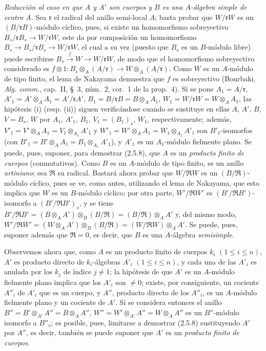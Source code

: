 \begin{env}[2.5.8.8]
\label{IV.2.5.8.8-fr}
\emph{Reducción al caso en que $A$ y $A'$ son cuerpos y $B$ es una $A$-álgebra
simple de centro $A$.} Sea $\mathfrak r$ el radical del anillo semi-local $A$;
basta probar que $W/\mathfrak rW$ es un $(B/\mathfrak rB)$-módulo cíclico,
pues, si existe un homomorfismo sobreyectivo
$B_s/\mathfrak rB_s\to W/\mathfrak rW$, este da por composición un
homomorfismo $B_s\to B_s/\mathfrak rB_s\to W/\mathfrak rW$, el cual a su vez
(puesto que $B_s$ es un $B$-módulo libre) puede escribirse
$B_s\xrightarrow{f}W\to W/\mathfrak rW$, de modo que el homomorfismo
sobreyectivo considerado es
$f\otimes1:B_s\otimes_A(A/\mathfrak r)\longrightarrow W\otimes_A(A/\mathfrak r)$.
Como $W$ es un $A$-módulo de tipo finito, el lema de Nakayama demuestra que
$f$ es sobreyectivo (Bourbaki, \emph{Alg. comm.}, cap.~II, \S~3,
núm.~2, cor.~1 de la prop.~4). Si se pone $A_1=A/\mathfrak r$, $A'_1=A'\otimes_A A_1=A'/\mathfrak rA'$,
$B_1=B/\mathfrak rB=B\otimes_A A_1$, $W_1=W/\mathfrak rW=W\otimes_A A_1$,
las hipótesis (i) (resp. (ii)) siguen verificándose cuando se sustituye en ellas
$A$, $A'$, $B$, $V=B_s$, $W$ por $A_1$, $A'_1$, $B_1$,
$V_1=(B_1)_s$, $W_1$, respectivamente; además,
$V'_1=V'\otimes_A A_1=V_1\otimes_{A_1}A'_1$ y
$W'_1=W'\otimes_A A_1=W_1\otimes_{A_1}A'_1$ son $B'_1$-isomorfos (con
$B'_1=B'\otimes_A A_1=B_1\otimes_{A_1}A'_1$), y $A'_1$ es un $A_1$-módulo
fielmente plano. Se puede, pues, suponer, para demostrar (2.5.8), que $A$ es un
\emph{producto finito de cuerpos} (conmutativos). Como $B$ es un $A$-módulo de
tipo finito, es un anillo \emph{artiniano}; sea $\mathfrak R$ su radical. Bastará ahora
probar que $W/\mathfrak RW$ es un $(B/\mathfrak R)$-módulo cíclico, pues se ve,
como antes, utilizando el lema de Nakayama, que esto implica que $W$ es un
$B$-módulo cíclico; por otra parte, $W'/\mathfrak RW'$ es
$(B'/\mathfrak RB')$-isomorfo a $(B'/\mathfrak RB')_s$, y se tiene
$B'/\mathfrak RB'=(B\otimes_A A')\otimes_B(B/\mathfrak R)=(B/\mathfrak R)\otimes_A A'$
y, del mismo modo,
$W'/\mathfrak RW'=(W\otimes_A A')\otimes_B(B/\mathfrak R)=(W/\mathfrak RW)\otimes_A A'$.
Se puede, pues, suponer además que $\mathfrak R=0$, es decir, que $B$ es una
$A$-álgebra \emph{semisimple}.

Observemos ahora que, como $A$ es un producto finito de cuerpos $k_i$
$(1\leq i\leq n)$, $A'$ es producto directo de $k_i$-álgebras $A'_i$
$(1\leq i\leq n)$, y cada una de las $A'_i$ es anulada por los $k_j$ de índice
$j\ne1$; la hipótesis de que $A'$ es un $A$-módulo fielmente plano implica
que los $A'_i$ son $\ne0$; existe, por consiguiente, un cociente $A''_i$ de
$A'_i$ que es un cuerpo, y $A''$, producto directo de los $A''_i$, es un
$A$-módulo fielmente plano y un cociente de $A'$. Si se considera entonces el
anillo $B''=B'\otimes_{A'}A''=B\otimes_A A''$,
$W''=W'\otimes_{A'}A''=W\otimes_A A''$ es un $B''$-módulo isomorfo a
$B''_s$; es posible, pues, limitarse a demostrar (2.5.8) sustituyendo $A'$ por
$A''$, es decir, también se puede suponer que $A'$ es un \emph{producto finito
de cuerpos}.


\end{env}
